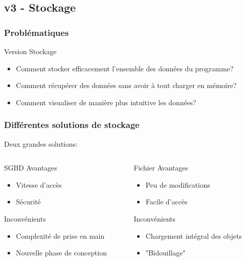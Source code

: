 \documentclass{beamer}
\begin{document}
        \subsection{v3 - Stockage}
        \begin{frame}
        \frametitle{Problématiques}
        Version Stockage
        \pause
        \begin{itemize}
        \item Comment stocker efficacement l'ensemble des données du programme?
        \pause
        \item Comment récupérer des données sans avoir à tout charger en mémoire?
        \pause
        \item Comment visualiser de manière plus intuitive les données?
        \end{itemize}
        \end{frame}
        \begin{frame}
        \frametitle{Différentes solutions de stockage}
        Deux grandes solutions:
        \pause
        \begin{columns}[t]
        \begin{column}{4cm}
        \begin{block}{SGBD}
        \pause
        Avantages
        \begin{itemize}
        \pause
        \item Vitesse d'accès
        \pause
        \item Sécurité
        \end{itemize}
        \pause
        Inconvénients
        \begin{itemize}
        \pause
        \item Complexité de prise en main
        \pause
        \item Nouvelle phase de conception
        \end{itemize}
        \end{block}
        \end{column}
        \pause
        \begin{column}{4cm}
        \begin{block}{Fichier}
        \pause
        Avantages
        \begin{itemize}
        \pause
        \item Peu de modifications
        \pause
        \item Facile d'accès
        \end{itemize}
        \pause
        Inconvénients
        \begin{itemize}
        \pause
        \item Chargement intégral des objets
        \pause
        \item "Bidouillage"
        \end{itemize}
        \end{block}
        \end{column}
        \end{columns}
        \end{frame}
\end{document}
